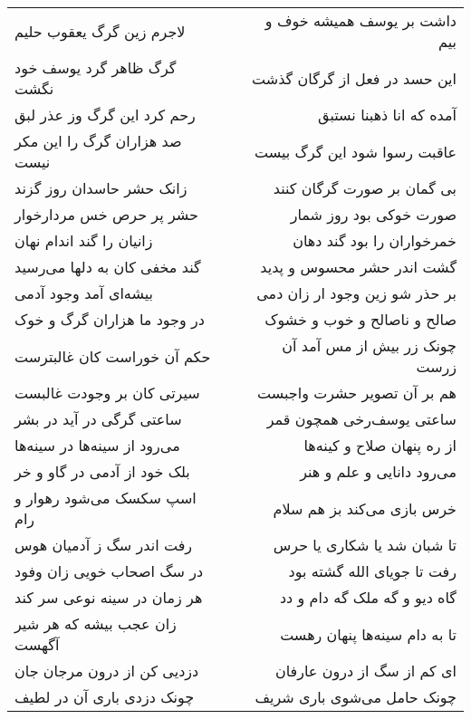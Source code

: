 \begin{center}
\begin{longtable}{l p{0.5cm} r}
لاجرم زین گرگ یعقوب حلیم
&&
داشت بر یوسف همیشه خوف و بیم
\\
گرگ ظاهر گرد یوسف خود نگشت
&&
این حسد در فعل از گرگان گذشت
\\
رحم کرد این گرگ وز عذر لبق
&&
آمده که انا ذهبنا نستبق
\\
صد هزاران گرگ را این مکر نیست
&&
عاقبت رسوا شود این گرگ بیست
\\
زانک حشر حاسدان روز گزند
&&
بی گمان بر صورت گرگان کنند
\\
حشر پر حرص خس مردارخوار
&&
صورت خوکی بود روز شمار
\\
زانیان را گند اندام نهان
&&
خمرخواران را بود گند دهان
\\
گند مخفی کان به دلها می‌رسید
&&
گشت اندر حشر محسوس و پدید
\\
بیشه‌ای آمد وجود آدمی
&&
بر حذر شو زین وجود ار زان دمی
\\
در وجود ما هزاران گرگ و خوک
&&
صالح و ناصالح و خوب و خشوک
\\
حکم آن خوراست کان غالبترست
&&
چونک زر بیش از مس آمد آن زرست
\\
سیرتی کان بر وجودت غالبست
&&
هم بر آن تصویر حشرت واجبست
\\
ساعتی گرگی در آید در بشر
&&
ساعتی یوسف‌رخی همچون قمر
\\
می‌رود از سینه‌ها در سینه‌ها
&&
از ره پنهان صلاح و کینه‌ها
\\
بلک خود از آدمی در گاو و خر
&&
می‌رود دانایی و علم و هنر
\\
اسپ سکسک می‌شود رهوار و رام
&&
خرس بازی می‌کند بز هم سلام
\\
رفت اندر سگ ز آدمیان هوس
&&
تا شبان شد یا شکاری یا حرس
\\
در سگ اصحاب خویی زان وفود
&&
رفت تا جویای الله گشته بود
\\
هر زمان در سینه نوعی سر کند
&&
گاه دیو و گه ملک گه دام و دد
\\
زان عجب بیشه که هر شیر آگهست
&&
تا به دام سینه‌ها پنهان رهست
\\
دزدیی کن از درون مرجان جان
&&
ای کم از سگ از درون عارفان
\\
چونک دزدی باری آن در لطیف
&&
چونک حامل می‌شوی باری شریف
\\
\end{longtable}
\end{center}
